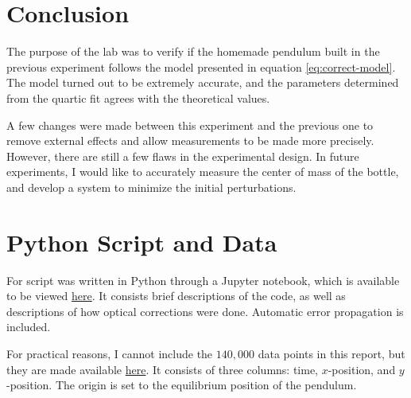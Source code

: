 \documentclass[%
 reprint,
 amsmath,amssymb
 aps,
]{revtex4-2}
\begin{document}
\section{Conclusion}
The purpose of the lab was to verify if the homemade pendulum built in the previous experiment follows the model presented in equation \ref{eq:correct-model}. The model turned out to be extremely accurate, and the parameters determined from the quartic fit agrees with the theoretical values.

A few changes were made between this experiment and the previous one to remove external effects and allow measurements to be made more precisely. However, there are still a few flaws in the experimental design. In future experiments, I would like to accurately measure the center of mass of the bottle, and develop a system to minimize the initial perturbations.



\onecolumngrid
\appendix
\section{Python Script and Data}
For script was written in Python through a Jupyter notebook, which is available to be viewed \href{https://github.com/QiLinXue/pendulum-labs/blob/main/lab2/Data%20Analysis.ipynb}{here}. It consists brief descriptions of the code, as well as descriptions of how optical corrections were done. Automatic error propagation is included.

For practical reasons, I cannot include the $140,000$ data points in this report, but they are made available \href{https://github.com/QiLinXue/pendulum-labs/blob/main/lab2/data.txt}{here}. It consists of three columns: time, $x$-position, and $y$-position. The origin is set to the equilibrium position of the pendulum.
\end{document}
